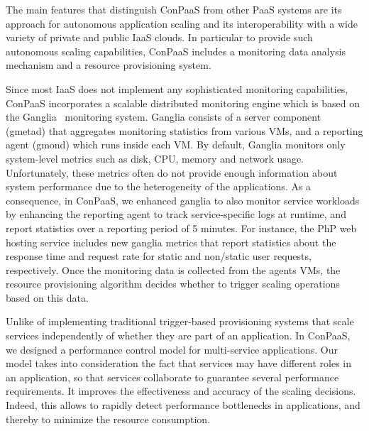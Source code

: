 The main features that distinguish ConPaaS from other PaaS systems are its approach for autonomous application scaling and its interoperability with a wide variety of private and public IaaS clouds. In particular to provide such autonomous scaling capabilities, ConPaaS includes a monitoring data analysis mechanism  and a resource provisioning system.

Since most IaaS does not implement any sophisticated monitoring capabilities, ConPaaS incorporates a scalable distributed monitoring engine which is based on the Ganglia~\cite{ganglia} monitoring system. Ganglia consists of a server component (gmetad) that aggregates monitoring statistics from various VMs, and a reporting agent (gmond) which runs inside each VM. By default, Ganglia monitors only system-level metrics such as disk, CPU, memory and network usage. Unfortunately, these metrics often do not provide enough information about system performance due to the heterogeneity of the applications. As a consequence, in ConPaaS, we enhanced ganglia to also monitor service workloads by enhancing the reporting agent to track service-specific logs at runtime, and report statistics over a reporting period of 5 minutes. For instance, the PhP web hosting service includes new ganglia metrics that report statistics about the response time and request rate for static and non/static user requests, respectively. Once the monitoring data is collected from the agents VMs, the resource provisioning  algorithm decides whether to trigger scaling operations based on this data. 

Unlike of implementing traditional trigger-based provisioning systems that scale services independently of whether they are part of an application. In ConPaaS, we designed a performance control model for multi-service applications. Our model takes into consideration the fact that services may have different roles in an application, so that services collaborate to guarantee several performance requirements. It improves the effectiveness and accuracy of the scaling decisions. Indeed, this allows to rapidly detect performance bottlenecks in applications, and thereby to minimize the resource consumption.




 

